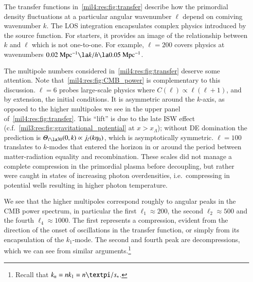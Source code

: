 



The transfer functions in~\cref{mil4:res:fig:transfer} describe how the primordial density fluctuations at a particular angular wavenumber $\ell$ depend on comiving wavenumber $k$. The LOS integration encapsulates complex physics introduced by the source function. For starters, it provides an image of the relationship between $k$ and $\ell$ which is not one-to-one. For example, $\ell=200$ covers physics at wavenumbers $0.02\unit{Mpc^{-1}} \la k/h \la 0.05\unit{Mpc^{-1}}$.

The multipole numbers considered in~\cref{mil4:res:fig:transfer} deserve some attention. Note that~\cref{mil4:res:fig:CMB_power} is complementary to this discussion. $\ell=6$ probes large-scale physics where $C(\ell) \propto \ell(\ell+1)$, and by extension, the initial conditions. It is asymmetric around the $k$-axis, as opposed to the higher multipoles we see in the upper panel of~\cref{mil4:res:fig:transfer}. This ``lift'' is due to the late ISW effect (c.f.~\cref{mil3:res:fig:gravitational_potential} at $x>x_\Lambda$); without DE domination the prediction is $\Theta_{\ell\la 30}(0, k)\propto j_\ell(k\eta_0)$, which is asymptotically symmetric. $\ell=100$ translates to $k$-modes that entered the horizon in or around the period between matter-radiation equality and recombination. These scales did not manage a complete compression in the primordial plasma before decoupling, but rather were caught in states of increasing photon overdensities, i.e.~compressing in potential wells resulting in higher photon temperature.  

We see that the higher multipoles correspond roughly to angular peaks in the CMB power spectrum, in particular the first $\ell_1 \approx 200$, the second $\ell_2 \approx 500$ and the fourth $\ell_4\approx 1000$. The first represents a compression, evident from the direction of the onset of oscillations in the transfer function, or simply from its encapsulation of the $k_1$-mode. The second and fourth peak are decompressions, which we can see from similar arguments.\footnote{Recall that $k_n=nk_1=n\pi/\sh$.} 



